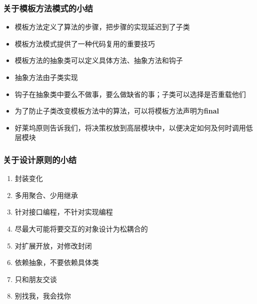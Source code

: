 \documentclass[compress]{beamer}
\begin{document}
\begin{frame}
\frametitle{关于模板方法模式的小结}
\begin{itemize}
\item 模板方法定义了算法的步骤，把步骤的实现延迟到了子类
\item 模板方法模式提供了一种代码复用的重要技巧
\item 模板方法的抽象类可以定义具体方法、抽象方法和钩子
\item 抽象方法由子类实现
\item 钩子在抽象类中要么不做事，要么做缺省的事；子类可以选择是否重载他们
\item 为了防止子类改变模板方法中的算法，可以将模板方法声明为\textbf{final}
\item 好莱坞原则告诉我们，将决策权放到高层模块中，以便决定如何及何时调用低层模块
\end{itemize}
\end{frame}

\begin{frame}
\frametitle{关于设计原则的小结}
  \begin{enumerate}
    \item 封装变化
    \item 多用聚合、少用继承
    \item 针对接口编程，不针对实现编程
    \item 尽最大可能将要交互的对象设计为松耦合的
    \item 对扩展开放，对修改封闭
    \item 依赖抽象，不要依赖具体类
    \item 只和朋友交谈
    \item 别找我，我会找你
  \end{enumerate}
\end{frame}
\end{document}
